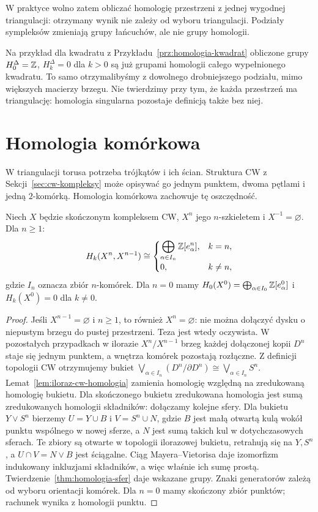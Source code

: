 W praktyce wolno zatem obliczać
homologię przestrzeni z jednej
wygodnej triangulacji: otrzymany
wynik nie zależy od wyboru
triangulacji. Podziały sympleksów
zmieniają grupy łańcuchów,
ale nie grupy homologii.

Na przykład dla kwadratu z
Przykładu~\ref{prz:homologia-kwadrat} obliczone grupy
$H_0^\Delta=\mathbb{Z}$, $H_k^\Delta=0$ dla $k>0$ są już grupami
homologii całego wypełnionego kwadratu. To samo otrzymalibyśmy
z dowolnego drobniejszego podziału, mimo większych macierzy brzegu.
Nie twierdzimy przy tym, że każda przestrzeń ma triangulację:
homologia singularna pozostaje definicją także bez niej.

\section{Homologia komórkowa}
\label{sec:homologia-komorkowa}

W triangulacji torusa potrzeba
trójkątów i ich ścian. Struktura
CW z Sekcji~\ref{sec:cw-kompleksy}
może opisywać go jednym punktem,
dwoma pętlami i jedną
$2$-komórką. Homologia komórkowa
zachowuje tę oszczędność.

\begin{twierdzenie}
\label{thm:warstwa-komorek}
Niech $X$ będzie skończonym
kompleksem CW, $X^n$ jego
$n$-szkieletem i $X^{-1}=\varnothing$.
Dla $n\geq1$:
\[
 H_k(X^n,X^{n-1})
 \cong
 \begin{cases}
 \displaystyle\bigoplus_{\alpha\in I_n}\mathbb{Z}[e_\alpha^n],
 &k=n,\\[3pt]0,&k\ne n,
 \end{cases}
\]
gdzie $I_n$ oznacza zbiór $n$-komórek.
Dla $n=0$ mamy
$H_0(X^0)=\bigoplus_{\alpha\in I_0}\mathbb{Z}[e_\alpha^0]$
i $H_k(X^0)=0$ dla $k\ne0$.
\end{twierdzenie}
\begin{proof}
Jeśli $X^{n-1}=\varnothing$ i $n\geq1$, to również $X^n=\varnothing$:
nie można dołączyć dysku o niepustym brzegu do pustej przestrzeni.
Teza jest wtedy oczywista. W pozostałych przypadkach
w ilorazie $X^n/X^{n-1}$
brzeg każdej dołączonej kopii
$D^n$ staje się jednym punktem,
a wnętrza komórek pozostają
rozłączne. Z definicji topologii
CW otrzymujemy bukiet
$\bigvee_{\alpha\in I_n}
(D^n/\partial D^n)\cong
\bigvee_{\alpha\in I_n}S^n$.
Lemat~\ref{lem:iloraz-cw-homologia}
zamienia homologię względną
na zredukowaną homologię bukietu.
Dla skończonego bukietu
zredukowana homologia jest sumą
zredukowanych homologii składników:
dołączamy kolejne sfery. Dla bukietu $Y\vee S^n$
bierzemy $U=Y\cup B$ i $V=S^n\cup N$, gdzie $B$ jest małą
otwartą kulą wokół punktu wspólnego w nowej sferze, a $N$
jest sumą takich kul w dotychczasowych sferach.
Te zbiory są otwarte w topologii ilorazowej bukietu,
retrahują się na $Y,S^n$, a $U\cap V=N\vee B$ jest ściągalne.
Ciąg Mayera--Vietorisa daje izomorfizm indukowany inkluzjami
składników, a więc właśnie ich sumę prostą.
Twierdzenie~\ref{thm:homologia-sfer}
daje wskazane grupy.
Znaki generatorów zależą
od wyboru orientacji komórek.
Dla $n=0$ mamy skończony
zbiór punktów; rachunek wynika
z homologii punktu.
\end{proof}

